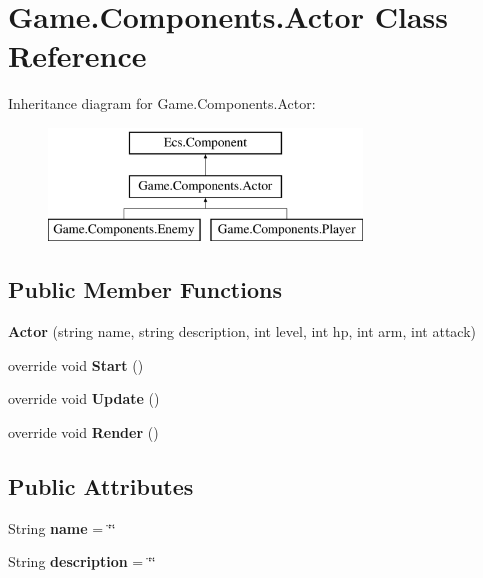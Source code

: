 \hypertarget{class_game_1_1_components_1_1_actor}{}\section{Game.\+Components.\+Actor Class Reference}
\label{class_game_1_1_components_1_1_actor}
Inheritance diagram for Game.\+Components.\+Actor\+:\begin{figure}[H]
\begin{center}
\leavevmode
\includegraphics[height=3.000000cm]{class_game_1_1_components_1_1_actor}
\end{center}
\end{figure}
\subsection*{Public Member Functions}
\begin{DoxyCompactItemize}
\item 
\mbox{\label{class_game_1_1_components_1_1_actor_a7ce72d5b0a98cf4c160e1f5fd24f880f}} 
{\bfseries Actor} (string name, string description, int level, int hp, int arm, int attack)
\item 
\mbox{\label{class_game_1_1_components_1_1_actor_ae23572d7be5ab106cfaed5907d8871e9}} 
override void {\bfseries Start} ()
\item 
\mbox{\label{class_game_1_1_components_1_1_actor_a947dffa306fa8a9cdcc33670de60dbb2}} 
override void {\bfseries Update} ()
\item 
\mbox{\label{class_game_1_1_components_1_1_actor_a42d934f32a3090d2c4abb1f739c257c1}} 
override void {\bfseries Render} ()
\end{DoxyCompactItemize}
\subsection*{Public Attributes}
\begin{DoxyCompactItemize}
\item 
\mbox{\label{class_game_1_1_components_1_1_actor_ab33fef069cd89d2b95b1948fe7a0f1eb}} 
String {\bfseries name} = \char`\"{}\char`\"{}
\item 
\mbox{\label{class_game_1_1_components_1_1_actor_a56d6ed805e0b74f0cf1c542f13b011a7}} 
String {\bfseries description} = \char`\"{}\char`\"{}
\end{DoxyCompactItemize}
